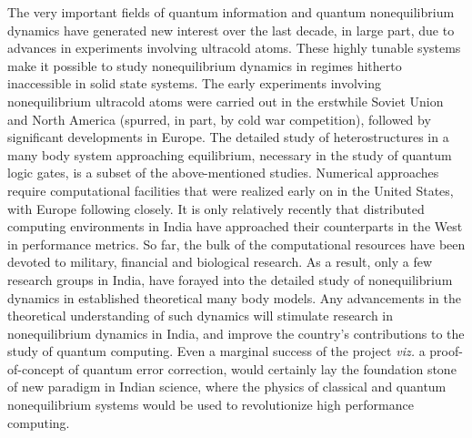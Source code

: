 \documentclass[a4paper,9pt]{article}
\begin{document}
The very important fields of quantum information and quantum nonequilibrium dynamics have generated new interest over the last decade, in large part, due to advances in experiments involving ultracold atoms. These highly tunable systems make it possible to study nonequilibrium dynamics in regimes hitherto inaccessible in solid state systems. The early experiments involving nonequilibrium ultracold atoms were carried out in the erstwhile Soviet Union and North America (spurred, in part, by cold war competition), followed by significant developments in Europe. The detailed study of heterostructures in a many body system approaching equilibrium, necessary in the study of quantum logic gates,  is a subset of the above-mentioned studies. Numerical approaches require computational facilities that were realized early on in the United States, with Europe following closely. It is only relatively recently that distributed computing environments in India have approached their counterparts in the West in performance metrics. So far, the bulk of the computational 
resources have been devoted to military, financial and biological research. As a result, only a few research groups in India, have forayed into the detailed study of nonequilibrium dynamics in established theoretical many body models.  Any advancements in the theoretical understanding of such dynamics will stimulate research in nonequilibrium dynamics in India, and improve the country's contributions to the study of quantum computing. Even a marginal success of the project \textit{viz.} a proof-of-concept of quantum error correction, would certainly lay the foundation stone of new paradigm in Indian science, where the physics of classical and quantum nonequilibrium systems would be used to revolutionize high performance computing.
\end{document}

